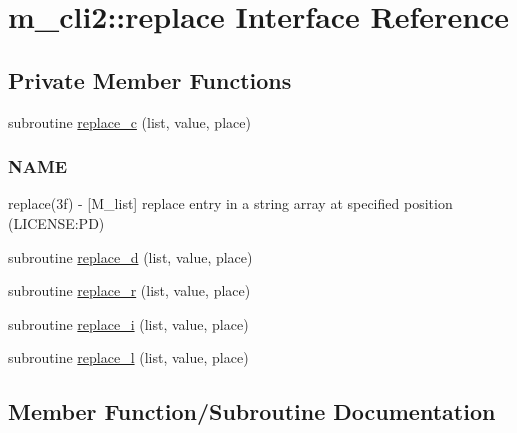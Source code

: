\hypertarget{interfacem__cli2_1_1replace}{}\section{m\+\_\+cli2\+:\+:replace Interface Reference}
\label{interfacem__cli2_1_1replace}
\subsection*{Private Member Functions}
\begin{DoxyCompactItemize}
\item 
subroutine \mbox{\hyperlink{interfacem__cli2_1_1replace_ab4d59b6a69d2768bf724f53604b3d0a9}{replace\+\_\+c}} (list, value, place)
\begin{DoxyCompactList}\small\item\em \subsubsection*{N\+A\+ME}

replace(3f) -\/ \mbox{[}M\+\_\+list\mbox{]} replace entry in a string array at specified position (L\+I\+C\+E\+N\+SE\+:PD) \end{DoxyCompactList}\item 
subroutine \mbox{\hyperlink{interfacem__cli2_1_1replace_a606ded35a3f0d06cb61a28db82ab5ae7}{replace\+\_\+d}} (list, value, place)
\item 
subroutine \mbox{\hyperlink{interfacem__cli2_1_1replace_adf284ee215097b8416e81532b7d4251b}{replace\+\_\+r}} (list, value, place)
\item 
subroutine \mbox{\hyperlink{interfacem__cli2_1_1replace_a73a0dab38328c3db8a7eef48e27390bd}{replace\+\_\+i}} (list, value, place)
\item 
subroutine \mbox{\hyperlink{interfacem__cli2_1_1replace_a9c995edced1d2665777e794a3aa5b2a0}{replace\+\_\+l}} (list, value, place)
\end{DoxyCompactItemize}


\subsection{Member Function/\+Subroutine Documentation}
\mbox{\label{interfacem__cli2_1_1replace_ab4d59b6a69d2768bf724f53604b3d0a9}} 
